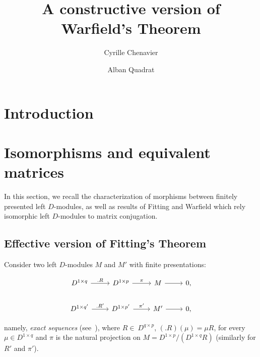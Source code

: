 \documentclass{ifacconf}
\begin{document}
\begin{frontmatter}

\title{A constructive version of Warfield's Theorem} 


\author[First]{Cyrille Chenavier} 
\author[Second]{Alban Quadrat} 


\address[First]{Inria Lille - Nord Europe,
  Villeneuve d'Ascq, France (e-mail: cyrille.chenavier@inria.fr).}
\address[Second]{Inria Paris, Universit\'e Pierre et Marie Curie,  
   Paris, France (e-mail: alban.quadrat@inria.fr).}

\begin{abstract}                %
\end{abstract}

\begin{keyword}

\end{keyword}

\end{frontmatter}

\section{Introduction}


\section{Isomorphisms and equivalent matrices}

In this section, we recall the characterization of morphisms between
finitely presented left $D$-modules, as well as results of Fitting and
Warfield which rely isomorphic left $D$-modules to matrix conjugation.

\subsection{Effective version of Fitting's Theorem}

Consider two left $D$-modules $M$ and $M'$ with finite presentations:
\medskip
\begin{small}
  \[\begin{tikzcd}
  D^{1\times q}\arrow[r, ".R"] &
  D^{1\times p}\arrow[r, "\pi"] &
  M\arrow[r] &
  0, 
  \\
  D^{1\times q'}\arrow[r, ".R'"] &
  D^{1\times p'}\arrow[r, "\pi'"] &
  M'\arrow[r] &
  0, 
  \end{tikzcd}\]
  \end{small}
\medskip
namely, \emph{exact sequences} (see~\cite{Ro:09}), where
$R\in~ D^{q\times p}$, $(.R)(\mu)=\mu R$, for every $\mu\in D^{1\times q}$
and $\pi$ is the natural projection on $M=D^{1\times p}/(D^{1\times q}R)$
(similarly for $R'$ and $\pi'$).
\end{document}
